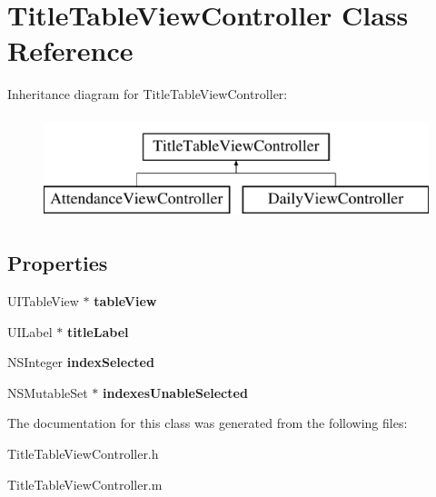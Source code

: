 \hypertarget{interface_title_table_view_controller}{\section{Title\+Table\+View\+Controller Class Reference}
\label{interface_title_table_view_controller}
}
Inheritance diagram for Title\+Table\+View\+Controller\+:\begin{figure}[H]
\begin{center}
\leavevmode
\includegraphics[height=3.000000cm]{interface_title_table_view_controller}
\end{center}
\end{figure}
\subsection*{Properties}
\begin{DoxyCompactItemize}
\item 
\hypertarget{interface_title_table_view_controller_a28fd55d5b91428c42c821986765afc79}{U\+I\+Table\+View $\ast$ {\bfseries table\+View}}\label{interface_title_table_view_controller_a28fd55d5b91428c42c821986765afc79}

\item 
\hypertarget{interface_title_table_view_controller_ac0cf26350746393ad93fae7c1dc0f071}{U\+I\+Label $\ast$ {\bfseries title\+Label}}\label{interface_title_table_view_controller_ac0cf26350746393ad93fae7c1dc0f071}

\item 
\hypertarget{interface_title_table_view_controller_a836ce3317d51d9812f9407611df8327e}{N\+S\+Integer {\bfseries index\+Selected}}\label{interface_title_table_view_controller_a836ce3317d51d9812f9407611df8327e}

\item 
\hypertarget{interface_title_table_view_controller_a97663dd3b86d043d6371a80216ecaf1d}{N\+S\+Mutable\+Set $\ast$ {\bfseries indexes\+Unable\+Selected}}\label{interface_title_table_view_controller_a97663dd3b86d043d6371a80216ecaf1d}

\end{DoxyCompactItemize}


The documentation for this class was generated from the following files\+:\begin{DoxyCompactItemize}
\item 
Title\+Table\+View\+Controller.\+h\item 
Title\+Table\+View\+Controller.\+m\end{DoxyCompactItemize}
